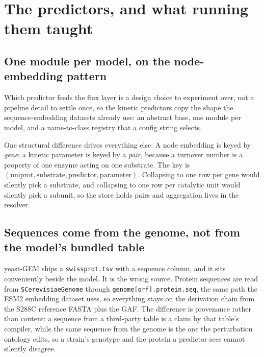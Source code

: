 
\section{The predictors, and what running them taught}

\subsection{One module per model, on the node-embedding pattern}

Which predictor feeds the flux layer is a design choice to experiment over, not a pipeline
detail to settle once, so the kinetic predictors copy the shape the sequence-embedding
datasets already use: an abstract base, one module per model, and a name-to-class registry
that a config string selects.

One structural difference drives everything else. A node embedding is keyed by
\emph{gene}; a kinetic parameter is keyed by a \emph{pair}, because a turnover number is a
property of one enzyme acting on one substrate. The key is
$(\textrm{uniprot}, \textrm{substrate}, \textrm{predictor}, \textrm{parameter})$.
Collapsing to one row per gene would silently pick a substrate, and collapsing to one row
per catalytic unit would silently pick a subunit, so the store holds pairs and aggregation
lives in the resolver.

\subsection{Sequences come from the genome, not from the model's bundled table}

yeast-GEM ships a \texttt{swissprot.tsv} with a sequence column, and it sits conveniently
beside the model. It is the wrong source. Protein sequences are read from
\texttt{SCerevisiaeGenome} through \texttt{genome[orf].protein.seq}, the same path the ESM2
embedding dataset uses, so everything stays on the derivation chain from the S288C
reference FASTA plus the GAF. The difference is provenance rather than content: a sequence
from a third-party table is a claim by that table's compiler, while the same sequence from
the genome is the one the perturbation ontology edits, so a strain's genotype and the
protein a predictor sees cannot silently disagree.

